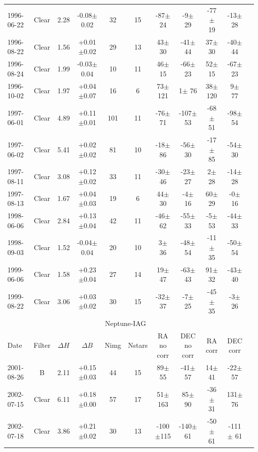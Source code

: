 \documentclass[12pt,a4paper]{report}
\begin{document}
\begin{landscape}
\begin{longtable}{|l|c|c|c|c|c|c|c|c|c|c|}
1996-06-22 & Clear & 2.28 & -0.08$\pm$0.02 &  32 &  15 &  -87$\pm$ 24 &   -9$\pm$ 29 &  -77$\pm$ 19 &  -13$\pm$ 28 \\ 
1996-08-22 & Clear & 1.56 & +0.01$\pm$0.02 &  29 &  13 &   43$\pm$ 30 &  -41$\pm$ 44 &   37$\pm$ 30 &  -40$\pm$ 44 \\ 
1996-08-24 & Clear & 1.99 & -0.03$\pm$0.04 &  10 &  11 &   46$\pm$ 15 &  -66$\pm$ 23 &   52$\pm$ 15 &  -67$\pm$ 23 \\ 
1996-10-02 & Clear & 1.97 & +0.04$\pm$0.07 &  16 &   6 &   73$\pm$121 &    1$\pm$ 76 &   38$\pm$120 &    9$\pm$ 77 \\ 
1997-06-01 & Clear & 4.89 & +0.11$\pm$0.01 & 101 &  11 &  -76$\pm$ 71 & -107$\pm$ 53 &  -68$\pm$ 51 &  -98$\pm$ 54 \\ 
1997-06-02 & Clear & 5.41 & +0.02$\pm$0.02 &  81 &  10 &  -18$\pm$ 86 &  -56$\pm$ 30 &  -17$\pm$ 85 &  -54$\pm$ 30 \\ 
1997-08-11 & Clear & 3.08 & +0.12$\pm$0.02 &  33 &  11 &  -30$\pm$ 46 &  -23$\pm$ 27 &    2$\pm$ 28 &  -14$\pm$ 28 \\ 
1997-08-13 & Clear & 1.67 & +0.04$\pm$0.03 &  19 &   6 &   44$\pm$ 30 &   -4$\pm$ 16 &   60$\pm$ 29 &   -0$\pm$ 16 \\ 
1998-06-06 & Clear & 2.84 & +0.13$\pm$0.04 &  42 &  11 &  -46$\pm$ 62 &  -55$\pm$ 33 &   -5$\pm$ 53 &  -44$\pm$ 33 \\ 
1998-09-03 & Clear & 1.52 & -0.04$\pm$0.04 &  20 &  10 &    3$\pm$ 36 &  -48$\pm$ 54 &  -11$\pm$ 35 &  -50$\pm$ 54 \\ 
1999-06-06 & Clear & 1.58 & +0.23$\pm$0.04 &  27 &  14 &   19$\pm$ 47 &  -63$\pm$ 43 &   91$\pm$ 32 &  -43$\pm$ 40 \\ 
1999-08-22 & Clear & 3.06 & +0.03$\pm$0.02 &  30 &  15 &  -32$\pm$ 37 &   -7$\pm$ 25 &  -45$\pm$ 35 &   -3$\pm$ 26 \\ 
\hline
\multicolumn{10}{|c|}{Neptune-IAG}\\
Date & Filter & $\Delta H$ & $\Delta B$ & Nimg & Nstars & RA no corr & DEC no corr & RA corr & DEC corr \\
\hline
2001-08-26 & B     & 2.11 & +0.15$\pm$0.03 &  44 &  15 &   89$\pm$ 55 &  -41$\pm$ 57 &   14$\pm$ 41 &  -22$\pm$ 57 \\ 
2002-07-15 & Clear & 6.11 & +0.18$\pm$0.00 &  57 &  17 &   51$\pm$163 &   85$\pm$ 90 &  -36$\pm$ 31 &  131$\pm$ 76 \\ 
2002-07-18 & Clear & 3.86 & +0.21$\pm$0.02 &  30 &  13 & -100$\pm$115 & -140$\pm$ 61 &  -50$\pm$ 61 & -111$\pm$ 61 \\ 

\end{longtable}
\end{landscape}
\end{document}
